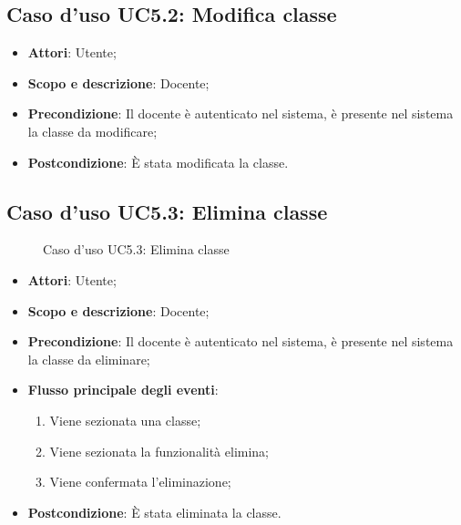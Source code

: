 \documentclass[12pt,a4paper]{article}
\begin{document}
\subsection{Caso d'uso UC5.2: Modifica classe}\begin{itemize}
	\item \textbf{Attori}: Utente;
	\item \textbf{Scopo e descrizione}: Docente; 
	\item \textbf{Precondizione}: Il docente è autenticato nel sistema, è presente nel sistema la classe da modificare;
	\item \textbf{Postcondizione}: È stata modificata la classe.
\end{itemize}
\hypertarget{UC5.3}{}
\subsection{Caso d'uso UC5.3: Elimina classe}
\begin{figure}[H]
	\centering

	\caption{Caso d'uso UC5.3: Elimina classe}\label{fig:UC5.3} 
\end{figure}\begin{itemize}
\item \textbf{Attori}: Utente;
\item \textbf{Scopo e descrizione}: Docente; 
\item \textbf{Precondizione}: Il docente è autenticato nel sistema, è presente nel sistema la classe da eliminare;

\item \textbf{Flusso principale degli eventi}:
\begin{enumerate}
	\item Viene sezionata una classe;
	\item Viene sezionata la funzionalità elimina;
	\item Viene confermata l'eliminazione;
	
\end{enumerate}
\item \textbf{Postcondizione}: È stata eliminata la classe.
\end{itemize}
\hypertarget{UC6}{}
\end{document}
